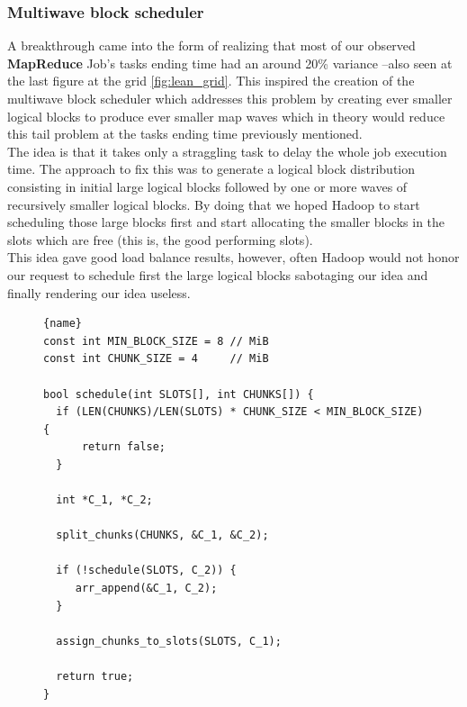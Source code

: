 \subsubsection{Multiwave block scheduler}

A breakthrough came into the form of realizing that most of our observed
\textbf{MapReduce} Job's tasks ending time had an around 20\% variance --also
seen at the last figure at the grid \ref{fig:lean_grid}. This inspired the
creation of the multiwave block scheduler which addresses this problem by
creating ever smaller logical blocks to produce ever smaller map waves which in
theory would reduce this tail problem at the tasks ending time previously
mentioned. \\

The idea is that it takes only a straggling task to delay the whole job
execution time. The approach to fix this was to generate a logical block
distribution consisting in initial large logical blocks followed by one or more
waves of recursively smaller logical blocks. By doing that we hoped Hadoop to
start scheduling those large blocks first and start allocating the smaller
blocks in the slots which are free (this is, the good performing slots). \\

This idea gave good load balance results, however, often Hadoop would not honor
our request to schedule first the large logical blocks sabotaging our idea and
finally rendering our idea useless.

\begin{figure}
\begin{lstlisting}[caption=Recursivily generate waves, label={lst:recursive}, frame=tb]{name}
const int MIN_BLOCK_SIZE = 8 // MiB
const int CHUNK_SIZE = 4     // MiB

bool schedule(int SLOTS[], int CHUNKS[]) {
  if (LEN(CHUNKS)/LEN(SLOTS) * CHUNK_SIZE < MIN_BLOCK_SIZE) {
      return false;
  }

  int *C_1, *C_2;

  split_chunks(CHUNKS, &C_1, &C_2);

  if (!schedule(SLOTS, C_2)) {
     arr_append(&C_1, C_2);
  }

  assign_chunks_to_slots(SLOTS, C_1);

  return true;
}
\end{lstlisting}
\end{figure}

